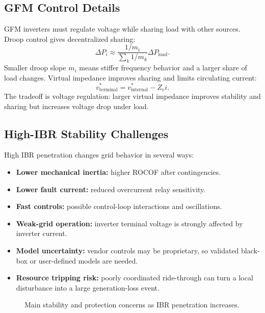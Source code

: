 \documentclass[11pt]{article}
\begin{document}
\subsection{GFM Control Details}
GFM inverters must regulate voltage while sharing load with other sources. Droop
control gives decentralized sharing:
\begin{equation}
\Delta P_i\approx \frac{1/m_i}{\sum_k 1/m_k}\Delta P_{\mathrm{load}}.
\end{equation}
Smaller droop slope $m_i$ means stiffer frequency behavior and a larger share of
load changes. Virtual impedance improves sharing and limits circulating current:
\begin{equation}
v_{\mathrm{terminal}}^*=v_{\mathrm{internal}}^*-Z_v i.
\end{equation}
The tradeoff is voltage regulation: larger virtual impedance improves stability
and sharing but increases voltage drop under load.

\subsection{High-IBR Stability Challenges}
High IBR penetration changes grid behavior in several ways:
\begin{itemize}
  \item \textbf{Lower mechanical inertia:} higher ROCOF after contingencies.
  \item \textbf{Lower fault current:} reduced overcurrent relay sensitivity.
  \item \textbf{Fast controls:} possible control-loop interactions and
  oscillations.
  \item \textbf{Weak-grid operation:} inverter terminal voltage is strongly
  affected by inverter current.
  \item \textbf{Model uncertainty:} vendor controls may be proprietary, so
  validated black-box or user-defined models are needed.
  \item \textbf{Resource tripping risk:} poorly coordinated ride-through can
  turn a local disturbance into a large generation-loss event.
\end{itemize}

\begin{figure}[h]
\centering
{}
\caption{Main stability and protection concerns as IBR penetration increases.}
\end{figure}
\end{document}
